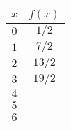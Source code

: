 \begin{tabular}{cc} \toprule
$x$  & $f(x)$   \\\midrule
$0$  & $1 / 2$  \\
$1$  & $7 / 2$  \\
$2$  & $13 / 2$ \\
$3$  & $19 / 2$ \\
$4$  &          \\
$5$  &          \\
$6$  &          \\\bottomrule
\end{tabular}
